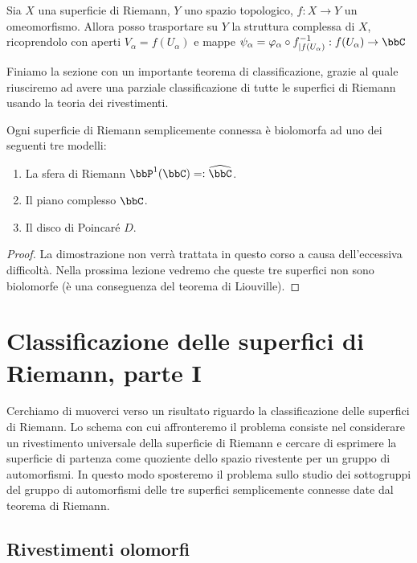 \begin{osservazione}
Sia $X$ una superficie di Riemann, $Y$ uno spazio topologico, $f:X\rightarrow Y$ un omeomorfismo. Allora posso trasportare su $Y$ la struttura complessa di $X$, ricoprendolo con aperti $V_\alpha=f(U_\alpha)$ e mappe $\psi_\alpha=\varphi_\alpha \circ f^{-1}_{|f(U_\alpha)}:f(U_\alpha)\rightarrow\bbC$
\end{osservazione}

Finiamo la sezione con un importante teorema di classificazione, grazie al quale riusciremo ad avere una parziale classificazione di tutte le superfici di Riemann usando la teoria dei rivestimenti.
\begin{teorema}[di Riemann]\label{teo_riemann}
Ogni superficie di Riemann semplicemente connessa è biolomorfa ad uno dei seguenti tre modelli:
\begin{enumerate}
  \item La sfera di Riemann $\bbP^1(\bbC)=:\widehat{\bbC}$.
  \item Il piano complesso $\bbC$.
  \item Il disco di Poincaré $D$.
\end{enumerate}
\end{teorema}
\begin{proof}
La dimostrazione non verrà trattata in questo corso a causa dell'eccessiva difficoltà.
Nella prossima lezione vedremo che queste tre superfici non sono biolomorfe (è una conseguenza del teorema di Liouville).
\end{proof}



\chapter{Classificazione delle superfici di Riemann, parte I}
Cerchiamo di muoverci verso un risultato riguardo la classificazione delle superfici di Riemann. Lo schema con cui affronteremo il problema consiste nel considerare un rivestimento universale della superficie di Riemann e cercare di esprimere la superficie di partenza come quoziente dello spazio rivestente per un gruppo di automorfismi. In questo modo sposteremo il problema sullo studio dei sottogruppi del gruppo di automorfismi delle tre superfici semplicemente connesse date dal teorema di Riemann.

\section{Rivestimenti olomorfi}


